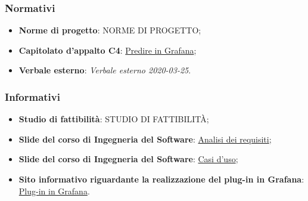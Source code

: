 \documentclass[../analisi-dei-requisiti.tex]{subfiles}
\begin{document}
\subsubsection{Normativi}%
\label{sssec:normativi}

\begin{itemize}
  \item \textbf{Norme di progetto}: \textsc{NORME DI PROGETTO};
  \item \textbf{Capitolato d'appalto C4}: \href{https://www.math.unipd.it/~tullio/IS-1/2019/Progetto/C4.pdf}{Predire in Grafana};
  \item \textbf{Verbale esterno}: \textit{Verbale esterno 2020-03-25}.
\end{itemize}

\subsubsection{Informativi}%
\label{sssec:informativi}

\begin{itemize}
  \item \textbf{Studio di fattibilità}: \textsc{STUDIO DI FATTIBILITÀ};
  \item \textbf{Slide del corso di Ingegneria del Software}: \href{https://www.math.unipd.it/~tullio/IS-1/2019/Dispense/L08.pdf}{Analisi dei requisiti};
  \item \textbf{Slide del corso di Ingegneria del Software}: \href{https://www.math.unipd.it/~tullio/IS-1/2019/Dispense/E03.pdf}{Casi d'uso};
  \item \textbf{Sito informativo riguardante la realizzazione del plug-in in Grafana}: \href{https://grafana.com/docs/grafana/latest/plugins/}{Plug-in in Grafana}.
\end{itemize}
\end{document}
